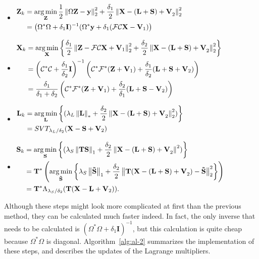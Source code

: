 \begin{itemize}[label={}]
    \item $\begin{aligned}
        \mathbf{Z}_k
        & = \operatorname*{arg\,min}_\mathbf{Z} \frac{1}{2} \left\lVert\Omega \mathbf{Z - y}\right\rVert_2^2 + \frac{\delta_1}{2}\left\lVert\mathbf{X - (L + S) + V}_2\right\rVert_2^2\\
        & = \left(\Omega^*\Omega + \delta_1 \mathbf{I})^{-1}(\Omega^*\mathbf{y} + \delta_1(\mathcal{FC}\mathbf{X - V}_1)\right)
    \end{aligned}$
    \item $\begin{aligned}
        \mathbf{X}_k
        & = \operatorname*{arg\,min}_\mathbf{X} \left\{ \frac{\delta_1}{2} \left\lVert\mathbf{Z} - \mathcal{FC}\mathbf{X + V}_1\right\rVert_2^2 + \frac{\delta_2}{2} \left\lVert\mathbf{X - (L + S) + V}_2\right\rVert_2^2 \right\}\\
        & = \left(\mathcal{C}^*\mathcal{C} + \frac{\delta_1}{\delta_2}\mathbf{I}\right)^{-1}\left(\mathcal{C}^*\mathcal{F}^* (\mathbf{Z + V}_1) + \frac{\delta_1}{\delta_2}(\mathbf{L+S+V}_2)\right)\\
        & = \frac{\delta_1}{\delta_1+\delta_2}\left(\mathcal{C}^*\mathcal{F}^* (\mathbf{Z+V}_1) + \frac{\delta_2}{\delta_1}(\mathbf{L+S-V}_2)\right)
    \end{aligned}$
    \item $\begin{aligned}
        \mathbf{L}_k
        & = \operatorname*{arg\,min}_\mathbf{L} \left\{ (\lambda_L \left\lVert\mathbf{L}\right\rVert_* + \frac{\delta_2}{2} \left\lVert\mathbf{X - (L + S) + V}_2\right\rVert_2^2) \right\}\\
        & = SVT_{\lambda_L / \delta_2} (\mathbf{X-S+V}_2)
    \end{aligned}$
    \item $\begin{aligned}
        \mathbf{S}_k
        & = \operatorname*{arg\,min}_\mathbf{S} \left\{ (\lambda_S \left\lVert\mathbf{TS}\right\rVert_1 + \frac{\delta_2}{2} \left\lVert\mathbf{X - (L + S) + V}_2\right\rVert^2) \right\}\\
        & = \mathbf{T}^* \left(\operatorname*{arg\,min}_\mathbf{\tilde{S}} \left\{\lambda_S \left\lVert\mathbf{\mathbf{\tilde{S}}}\right\rVert_1 + \frac{\delta_2}{2} \left\lVert\mathbf{T(X - (L + S) + V}_2) - \mathbf{\mathbf{\tilde{S}}}\right\rVert_2^2\right\}\right)\\
        & = \mathbf{T}^* \Lambda_{\lambda_S / \delta_2} (\mathbf{T}(\mathbf{X - L + V}_2)).
    \end{aligned}$
\end{itemize}
Although these steps might look more complicated at first than the previous method, they can be calculated much faster indeed. In fact, the only inverse that needs to be calculated is $(\Omega^*\Omega + \delta_1 \mathbf{I})^{-1}$, but this calculation is quite cheap because $\Omega^*\Omega$ is diagonal. Algorithm~\ref{alg:al-2} summarizes the implementation of these steps, and describes the updates of the Lagrange multipliers.

